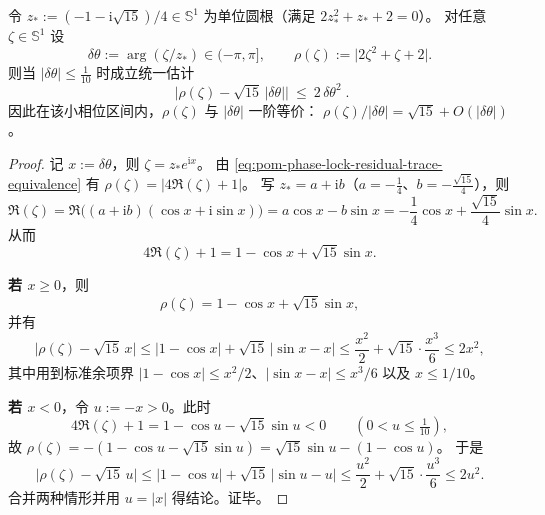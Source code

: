 

\begin{proposition}\label{prop:pom-phase-residual-linearization-sqrt15}
令 \(z_\ast:=(-1-\mathrm{i}\sqrt{15})/4\in\mathbb{S}^1\) 为单位圆根（满足 \(2z_\ast^2+z_\ast+2=0\)）。
对任意 \(\zeta\in\mathbb{S}^1\) 设
\[
\delta\theta:=\arg(\zeta/z_\ast)\in(-\pi,\pi],
\qquad
\rho(\zeta):=\bigl|2\zeta^2+\zeta+2\bigr|.
\]
则当 \(|\delta\theta|\le \tfrac{1}{10}\) 时成立统一估计
\[
\boxed{\;
\bigl|\rho(\zeta)-\sqrt{15}\,|\delta\theta|\bigr|\ \le\ 2\,\delta\theta^{2}\; }.
\]
因此在该小相位区间内，\(\rho(\zeta)\) 与 \(|\delta\theta|\) 一阶等价：
\(
\rho(\zeta)/|\delta\theta|=\sqrt{15}+O(|\delta\theta|)
\)。
\end{proposition}
\begin{proof}
记 \(x:=\delta\theta\)，则 \(\zeta=z_\ast e^{\mathrm{i}x}\)。
由 \eqref{eq:pom-phase-lock-residual-trace-equivalence} 有 \(\rho(\zeta)=|4\Re(\zeta)+1|\)。
写 \(z_\ast=a+\mathrm{i}b\)（\(a=-\tfrac14\)、\(b=-\tfrac{\sqrt{15}}{4}\)），则
\[
\Re(\zeta)=\Re\bigl((a+\mathrm{i}b)(\cos x+\mathrm{i}\sin x)\bigr)=a\cos x-b\sin x
=-\frac14\cos x+\frac{\sqrt{15}}{4}\sin x.
\]
从而
\[
4\Re(\zeta)+1=1-\cos x+\sqrt{15}\sin x.
\]
\par
\textbf{若 \(x\ge 0\)}，则
\[
\rho(\zeta)=1-\cos x+\sqrt{15}\sin x,
\]
并有
\[
\bigl|\rho(\zeta)-\sqrt{15}\,x\bigr|
\le |1-\cos x|+\sqrt{15}\,|\sin x-x|
\le \frac{x^2}{2}+\sqrt{15}\cdot\frac{x^3}{6}
\le 2x^2,
\]
其中用到标准余项界 \(|1-\cos x|\le x^2/2\)、\(|\sin x-x|\le x^3/6\) 以及 \(x\le 1/10\)。
\par
\textbf{若 \(x<0\)}，令 \(u:=-x>0\)。此时
\[
4\Re(\zeta)+1=1-\cos u-\sqrt{15}\sin u<0\qquad(0<u\le\tfrac{1}{10}),
\]
故 \(\rho(\zeta)=-(1-\cos u-\sqrt{15}\sin u)=\sqrt{15}\sin u-(1-\cos u)\)。
于是
\[
\bigl|\rho(\zeta)-\sqrt{15}\,u\bigr|
\le |1-\cos u|+\sqrt{15}\,|\sin u-u|
\le \frac{u^2}{2}+\sqrt{15}\cdot\frac{u^3}{6}
\le 2u^2.
\]
合并两种情形并用 \(u=|x|\) 得结论。证毕。
\end{proof}

